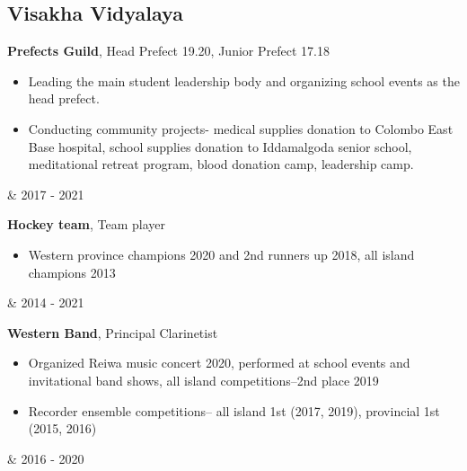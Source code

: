 \documentclass[10pt, a4paper]{article}
\newenvironment{highlights}{
        \begin{itemize}[
                topsep=0pt,
                parsep=0.10 cm,
                partopsep=0pt,
                itemsep=0pt,
                after=\vspace{-1\baselineskip},
                leftmargin=0.4 cm + 3pt
            ]
    }{
        \end{itemize}
    } %
\let\originalTabularx\tabularx
\let\originalEndTabularx\endtabularx
\renewenvironment{tabularx}{\bgroup\centering\originalTabularx}{\originalEndTabularx\par\egroup}
\begin{document}
	\subsection{Visakha Vidyalaya}
		\begin{tabularx}{\textwidth-0.4 cm-0.13cm}{K{0.2 cm} R{4.1 cm}}
            \textbf{Prefects Guild}, Head Prefect 19.20, Junior Prefect 17.18
            \vspace{0.10 cm}
            \begin{highlights}
            \item Leading the main student leadership body and organizing school events as the head prefect.
		\item Conducting community projects- medical supplies donation to Colombo East Base hospital, school supplies donation to Iddamalgoda senior school, meditational retreat program, blood donation camp, leadership camp.
            \end{highlights}
            &
            2017 - 2021
           \end{tabularx}
			
		\vspace{0.2 cm}
		\begin{tabularx}{\textwidth-0.4 cm-0.13cm}{K{0.2 cm} R{4.1 cm}}
            \textbf{Hockey team}, Team player
            \vspace{0.10 cm}
            \begin{highlights}
	        \item Western province champions 2020 and 2nd runners up 2018, all island champions 2013
	        \end{highlights}
            &
            2014 - 2021
           \end{tabularx}
			
		\vspace{0.2 cm}	
		\begin{tabularx}{\textwidth-0.4 cm-0.13cm}{K{0.2 cm} R{4.1 cm}}
            \textbf{Western Band}, Principal Clarinetist
            \vspace{0.10 cm}
             \begin{highlights}
	        \item Organized Reiwa music concert 2020, performed at school events and invitational band shows, all island competitions–2nd place 2019
		\item Recorder ensemble competitions– all island 1st (2017, 2019), provincial 1st (2015, 2016)
	        \end{highlights}
            &
            2016 - 2020
           \end{tabularx}
           
\end{document}
